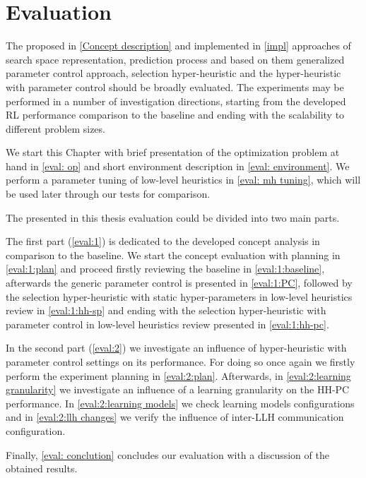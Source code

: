 \chapter{Evaluation}\label{eval}
The proposed in \cref{Concept description} and implemented in \cref{impl} approaches of search space representation, prediction process and based on them generalized parameter control approach, selection hyper-heuristic and the hyper-heuristic with parameter control should be broadly evaluated. The experiments may be performed in a number of investigation directions, starting from the developed RL performance comparison to the baseline and ending with the scalability to different problem sizes.

We start this Chapter with brief presentation of the optimization problem at hand in \cref{eval: op} and short environment description in \cref{eval: environment}. We perform a parameter tuning of low-level heuristics in \cref{eval: mh tuning}, which will be used later through our tests for comparison. 

The presented in this thesis evaluation could be divided into two main parts.

The first part (\cref{eval:1}) is dedicated to the developed concept analysis in comparison to the baseline. We start the concept evaluation with planning in \cref{eval:1:plan} and proceed firstly reviewing the baseline in \cref{eval:1:baseline}, afterwards the generic parameter control is presented in \cref{eval:1:PC}, followed by the selection hyper-heuristic with static hyper-parameters in low-level heuristics review in \cref{eval:1:hh-sp} and ending with the selection hyper-heuristic with parameter control in low-level heuristics review presented in \cref{eval:1:hh-pc}.

In the second part (\cref{eval:2}) we investigate an influence of hyper-heuristic with parameter control settings on its performance. For doing so once again we firstly perform the experiment planning in \cref{eval:2:plan}. Afterwards, in \cref{eval:2:learning granularity} we investigate an influence of a learning granularity on the HH-PC performance. In \cref{eval:2:learning models} we check learning models configurations and in \cref{eval:2:llh changes} we verify the influence of inter-LLH communication configuration.

Finally, \cref{eval: conclution} concludes our evaluation with a discussion of the obtained results.


